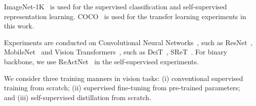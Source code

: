\documentclass[10pt,twocolumn,letterpaper]{article}
\begin{document}
ImageNet-1K~\cite{deng2009imagenet} is used for the supervised classification and self-supervised representation learning. COCO~\cite{lin2014microsoft} is used for the transfer learning experiments in this work.

 Experiments are conducted on Convolutional Neural Networks~\cite{lecun1995convolutional}, such as ResNet~\cite{he2016deep}, MobileNet~\cite{howard2017mobilenets} and Vision Transformers~\cite{vaswani2017attention,dosovitskiy2020image}, such as DeiT~\cite{touvron2021training}, SReT~\cite{shen2021sliced}. For binary backbone, we use ReActNet~\cite{liu2020reactnet} in the self-supervised experiments.

 We consider three training manners in vision tasks: (i) conventional supervised training from scratch; (ii) supervised fine-tuning from pre-trained parameters; and (iii) self-supervised distillation from scratch.


\begin{table}[t]
\centering
\caption{Comparison between ReLabel~\cite{yun2021re} and our FKD on ImageNet-1K. ``'' denotes our training following the same protocol in Table~\ref{tab:my-table_relabel_ours_com} w/o distillation. Models are trained from scratch.}
\label{tab:my-table_relabel}
\vspace{-0.1in}
\vspace{-0.1in}
\end{table}
\end{document}
